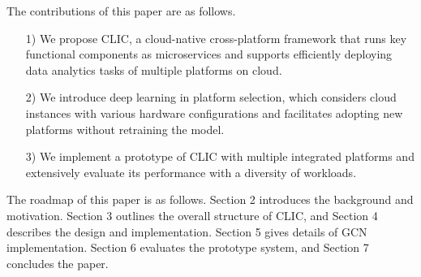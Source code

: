 The contributions of this paper are as follows.
\begin{itemize}
\item [1)]
We propose CLIC, a cloud-native cross-platform framework that runs key functional components as microservices and supports efficiently deploying data analytics tasks of multiple platforms on cloud.
\item [2)]
We introduce deep learning in platform selection, which considers cloud instances with various hardware configurations and facilitates adopting new platforms without retraining the model.
\item [3)]
We implement a prototype of CLIC with multiple integrated platforms and extensively evaluate its performance with a diversity of workloads.

\end{itemize}

The roadmap of this paper is as follows. Section 2 introduces the background and motivation. Section 3 outlines the overall structure of CLIC, and Section 4 describes the design and implementation. Section 5 gives details of GCN implementation. Section 6 evaluates the prototype system, and Section 7 concludes the paper.

